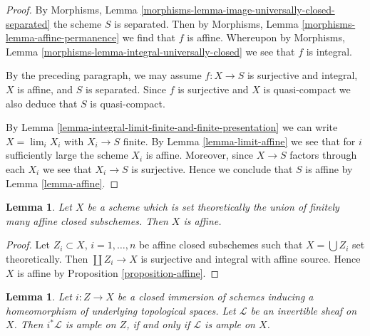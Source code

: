 \documentclass{stacks-project}
\theoremstyle{plain}
\newtheorem{lemma}[subsection]{Lemma}
\theoremstyle{definition}
\theoremstyle{remark}
\numberwithin{equation}{subsection}
\def\lim{\mathop{\mathrm{lim}}\nolimits}
\begin{document}
\begin{proof}
By Morphisms, Lemma \ref{morphisms-lemma-image-universally-closed-separated}
the scheme $S$ is separated. Then by
Morphisms, Lemma \ref{morphisms-lemma-affine-permanence}
we find that $f$ is affine. Whereupon by
Morphisms, Lemma \ref{morphisms-lemma-integral-universally-closed}
we see that $f$ is integral.

\medskip\noindent
By the preceding paragraph, we may assume $f : X \to S$
is surjective and integral, $X$ is affine, and $S$ is separated.
Since $f$ is surjective and $X$ is quasi-compact we also deduce that $S$ is
quasi-compact.

\medskip\noindent
By Lemma \ref{lemma-integral-limit-finite-and-finite-presentation}
we can write $X = \lim_i X_i$ with $X_i \to S$ finite. By
Lemma \ref{lemma-limit-affine}
we see that for $i$ sufficiently large the scheme $X_i$ is affine.
Moreover, since $X \to S$ factors through each $X_i$ we see that
$X_i \to S$ is surjective. Hence we conclude that $S$ is affine by
Lemma \ref{lemma-affine}.
\end{proof}

\begin{lemma}
\label{lemma-affines-glued-in-closed-affine}
Let $X$ be a scheme which is set theoretically the union of
finitely many affine closed subschemes. Then $X$ is affine.
\end{lemma}

\begin{proof}
Let $Z_i \subset X$, $i = 1, \ldots, n$ be affine closed subschemes such that
$X = \bigcup Z_i$ set theoretically. Then $\coprod Z_i \to X$ is surjective
and integral with affine source. Hence $X$ is affine by
Proposition \ref{proposition-affine}.
\end{proof}

\begin{lemma}
\label{lemma-ample-on-reduction}
Let $i : Z \to X$ be a closed immersion of schemes
inducing a homeomorphism of underlying topological spaces.
Let $\mathcal{L}$ be an invertible sheaf on $X$.
Then $i^*\mathcal{L}$ is ample on $Z$, if and only if $\mathcal{L}$
is ample on $X$.
\end{lemma}
\end{document}
